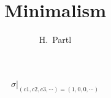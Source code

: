 \documentclass[UTF8]{article}
\author{H.~Partl}
\title{Minimalism}
\begin{document}
\begin{equation}
{\sigma |}_{(c1,c2,c3,\cdots)=(1,0,0,\cdots)}
\end{equation}
\end{document}
